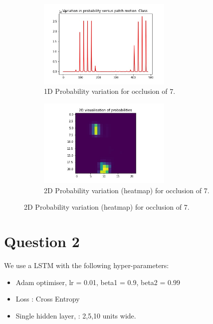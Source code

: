 \begin{figure}[!htbp]
\begin{subfigure}
\centering
\includegraphics[angle=0,width=0.7\textwidth]{assign-2/logs/occ/1d-var-7.jpg}
\caption{1D Probability variation for occlusion of 7.}
\end{subfigure}
\begin{subfigure}
\centering
\includegraphics[angle=0,width=0.7\textwidth]{assign-2/logs/occ/2d-var-7.jpg}
\caption{2D Probability variation (heatmap) for occlusion of 7.}
\end{subfigure}
\end{figure}

\section{Question 2 }

We use a LSTM with the following hyper-parameters:

\begin{itemize}
\item  Adam optimiser, lr = 0.01, beta1 = 0.9, beta2 = 0.99
\item  Loss : Cross Entropy
\item  Single hidden layer, : 2,5,10 units wide.
\end{itemize}

